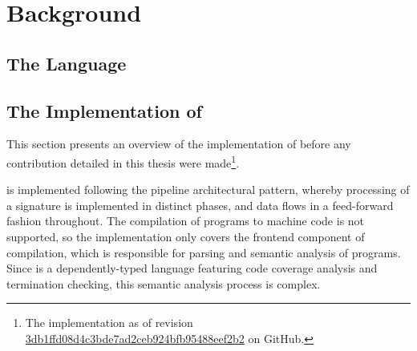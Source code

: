 \chapter{Background}

\section{The \Beluga Language}

\section{The Implementation of \Beluga} \label{section:beluga-implementation}

This section presents an overview of the implementation of \Beluga before any contribution detailed in this thesis were made\footnote{The implementation as of revision \href{https://github.com/Beluga-lang/Beluga/tree/3db1ffd08d4c3bde7ad2ceb924bfb95488eef2b2}{3db1ffd08d4c3bde7ad2ceb924bfb95488eef2b2} on GitHub.}.

\Beluga is implemented following the pipeline architectural pattern, whereby processing of a \Beluga signature is implemented in distinct phases, and data flows in a feed-forward fashion throughout.
The compilation of \Beluga programs to machine code is not supported, so the implementation only covers the frontend component of compilation, which is responsible for parsing and semantic analysis of programs.
Since \Beluga is a dependently-typed language featuring code coverage analysis and termination checking, this semantic analysis process is complex.

